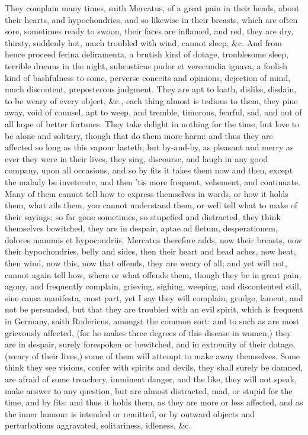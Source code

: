 {They complain many times, saith Mercatus, of a great pain in their
heads, about their hearts, and hypochondries, and so likewise in their
breasts, which are often sore, sometimes ready to swoon, their faces
are inflamed, and red, they are dry, thirsty, suddenly hot, much
troubled with wind, cannot sleep, \&c. And from hence proceed ferina
deliramenta, a brutish kind of dotage, troublesome sleep, terrible
dreams in the night, subrusticus pudor et verecundia ignava, a foolish
kind of bashfulness to some, perverse conceits and opinions,
dejection of mind, much discontent, preposterous judgment. They
are apt to loath, dislike, disdain, to be weary of every object, \&c.,
each thing almost is tedious to them, they pine away, void of counsel,
apt to weep, and tremble, timorous, fearful, sad, and out of all hope
of better fortunes. They take delight in nothing for the time, but love
to be alone and solitary, though that do them more harm: and thus they
are affected so long as this vapour lasteth; but by-and-by, as pleasant
and merry as ever they were in their lives, they sing, discourse, and
laugh in any good company, upon all occasions, and so by fits it takes
them now and then, except the malady be inveterate, and then 'tis more
frequent, vehement, and continuate. Many of them cannot tell how to
express themselves in words, or how it holds them, what ails them, you
cannot understand them, or well tell what to make of their sayings; so
far gone sometimes, so stupefied and distracted, they think themselves
bewitched, they are in despair, aptae ad fletum, desperationem, dolores
mammis et hypocondriis. Mercatus therefore adds, now their breasts, now
their hypochondries, belly and sides, then their heart and head aches,
now heat, then wind, now this, now that offends, they are weary of all;
and yet will not, cannot again tell how, where or what offends
them, though they be in great pain, agony, and frequently complain,
grieving, sighing, weeping, and discontented still, sine causa
manifesta, most part, yet I say they will complain, grudge, lament, and
not be persuaded, but that they are troubled with an evil spirit, which
is frequent in Germany, saith Rodericus, amongst the common sort: and
to such as are most grievously affected, (for he makes three degrees of
this disease in women,) they are in despair, surely forespoken or
bewitched, and in extremity of their dotage, (weary of their lives,)
some of them will attempt to make away themselves. Some think they see
visions, confer with spirits and devils, they shall surely be damned,
are afraid of some treachery, imminent danger, and the like, they will
not speak, make answer to any question, but are almost distracted, mad,
or stupid for the time, and by fits: and thus it holds them, as they
are more or less affected, and as the inner humour is intended or
remitted, or by outward objects and perturbations aggravated,
solitariness, idleness, \&c.

}
